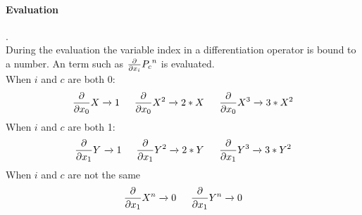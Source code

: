 \paragraph{Evaluation}.\\
During the evaluation the variable index in a differentiation operator is bound to a number.
An \name{} term such as $\expPolyTermD{P_c}{n}{i}$ is evaluated.\\
When $i$ and $c$ are both 0:\\ 
$$\frac{\partial}{\partial x_0} X \rewriteEINEXP  1 
 \indent  \frac{\partial}{\partial x_0} X^2 \rewriteEINEXP  2*\expPolyTerm{X}{}  
  \indent \frac{\partial}{\partial x_0} X^3  \rewriteEINEXP  3*X^{2} $$ 
When $i$ and $c$ are both 1:\\ 
$$
\expPolyTermD{Y}{}{1} \rewriteEINEXP  1 
 \indent  \expPolyTermD{Y}{2}{1} \rewriteEINEXP  2*\expPolyTerm{Y}{}  
  \indent  \expPolyTermD{Y}{3}{1} \rewriteEINEXP  3*\expPolyTerm{Y}{2}  
   $$  
When $i$ and $c$ are not the same\\ 
$$ \expPolyTermD{X}{n}{1} \rewriteEINEXP  0 
\indent \expPolyTermD{Y}{n}{1} \rewriteEINEXP  0  $$ 
